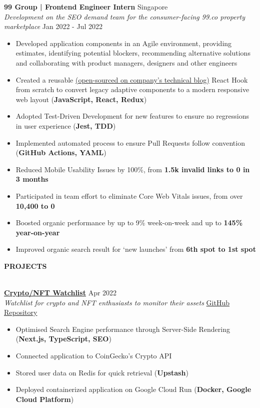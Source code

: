 \documentclass[a4paper]{article}
\newcommand{\lineunder} {
    \vspace*{-8pt} \\
    \hspace*{-12pt} \hrulefill \\
}
\newcommand{\header} [1] {
    {\hspace*{-12pt}\vspace*{6pt} \large\textbf{#1}}
    \vspace*{-6pt} \lineunder
}
\begin{document}
\textbf{99 Group | Frontend Engineer Intern} \hfill Singapore\\
\textit{Development on the SEO demand team for the consumer-facing 99.co property marketplace} \hfill Jan 2022 - Jul 2022\\
\vspace{-2mm}
\begin{itemize} \itemsep 1pt
    \item Developed application components in an Agile environment, providing estimates, identifying potential blockers, recommending alternative solutions and collaborating with product managers, designers and other engineers
	\item Created a reusable \href{https://medium.com/99dotco/adaptive-to-responsive-in-1-react-hook-4d1ce93e1488}{(open-sourced on company's technical blog)} React Hook from scratch to convert legacy adaptive components to a modern responsive web layout (\textbf{JavaScript, React, Redux})
	\item Adopted Test-Driven Development for new features to ensure no regressions in user experience (\textbf{Jest, TDD})
	\item Implemented automated process to ensure Pull Requests follow convention (\textbf{GitHub Actions, YAML})
	\item Reduced Mobile Usability Issues by 100\%, from \textbf{1.5k invalid links to 0 in 3 months}
	\item Participated in team effort to eliminate Core Web Vitals issues, from over \textbf{10,400 to 0}
	\item Boosted organic performance by up to 9\% week-on-week and up to \textbf{145\% year-on-year}
	\item Improved organic search result for ‘new launches’ from \textbf{6th spot to 1st spot}
\end{itemize}

\header{PROJECTS}
\vspace{1mm}


\textbf{\href{https://crypto-docker-nypoewfveq-uc.a.run.app/}{Crypto/NFT Watchlist}} \hfill Apr 2022\\
\textit{Watchlist for crypto and NFT enthusiasts to monitor their assets} \hfill \href{https://github.com/jianrong7/crypto-ts}{GitHub Repository}\\
\vspace{-2mm}
\begin{itemize} \itemsep 1pt
    \item Optimised Search Engine performance through Server-Side Rendering (\textbf{Next.js, TypeScript, SEO})
    \item Connected application to CoinGecko's Crypto API
    \item Stored user data on Redis for quick retrieval (\textbf{Upstash})
    \item Deployed containerized application on Google Cloud Run (\textbf{Docker, Google Cloud Platform})
\end{itemize}
\end{document}
